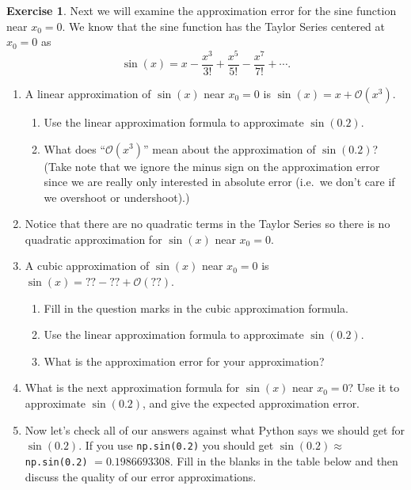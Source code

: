 \documentclass[
]{book}
\providecommand{\tightlist}{%
  \setlength{\itemsep}{0pt}\setlength{\parskip}{0pt}}
\theoremstyle{definition}
\theoremstyle{definition}
\theoremstyle{definition}
\newtheorem{exercise}{Exercise}[chapter]
\theoremstyle{remark}
\begin{document}
\begin{exercise}
\protect\hypertarget{exr:unnamed-chunk-49}{}{\label{exr:unnamed-chunk-49} }Next we will examine the approximation error for the sine function near \(x_0 = 0\). We know that the sine function has the Taylor Series centered at \(x_0 = 0\) as
\[ \sin(x) = x - \frac{x^3}{3!} + \frac{x^5}{5!} - \frac{x^7}{7!} + \cdots. \]

\begin{enumerate}
\def\labelenumi{\alph{enumi}.}
\tightlist
\item
  A linear approximation of \(\sin(x)\) near \(x_0 = 0\) is \(\sin(x) = x + \mathcal{O}(x^3)\).

  \begin{enumerate}
  \def\labelenumii{\roman{enumii}.}
  \tightlist
  \item
    Use the linear approximation formula to approximate \(\sin(0.2)\).
  \item
    What does ``\(\mathcal{O}(x^3)\)'' mean about the approximation of \(\sin(0.2)\)?\\
    (Take note that we ignore the minus sign on the approximation error since we are really only interested in absolute error (i.e.~we don't care if we overshoot or undershoot).)
  \end{enumerate}
\item
  Notice that there are no quadratic terms in the Taylor Series so there is no quadratic approximation for \(\sin(x)\) near \(x_0 =0\).
\item
  A cubic approximation of \(\sin(x)\) near \(x_0 = 0\) is \(\sin(x) = ?? - ?? + \mathcal{O}(??)\).

  \begin{enumerate}
  \def\labelenumii{\roman{enumii}.}
  \tightlist
  \item
    Fill in the question marks in the cubic approximation formula.
  \item
    Use the linear approximation formula to approximate \(\sin(0.2)\).
  \item
    What is the approximation error for your approximation?
  \end{enumerate}
\item
  What is the next approximation formula for \(\sin(x)\) near \(x_0 = 0\)? Use it to approximate \(\sin(0.2)\), and give the expected approximation error.
\item
  Now let's check all of our answers against what Python says we should get for \(\sin(0.2)\). If you use \texttt{np.sin(0.2)} you should get \(\sin(0.2) \approx\) \texttt{np.sin(0.2)} \(=0.1986693308\). Fill in the blanks in the table below and then discuss the quality of our error approximations.
\end{enumerate}


\end{exercise}
\end{document}
